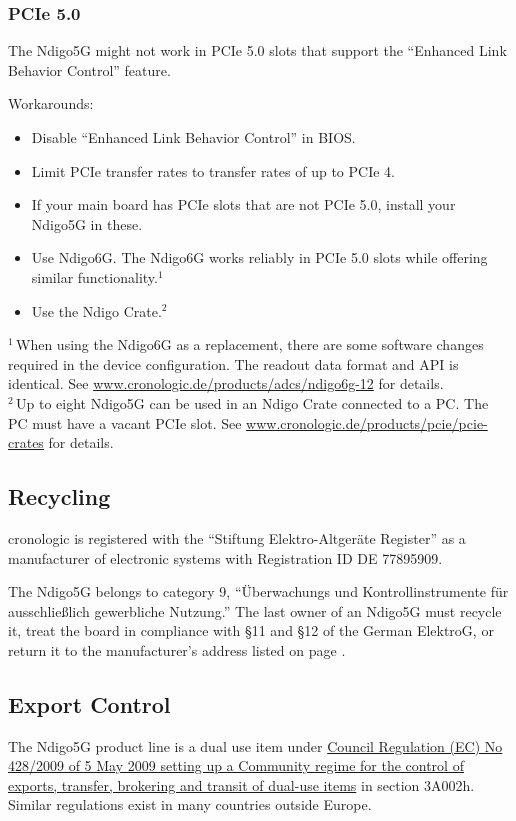 \subsubsection{PCIe 5.0}
The Ndigo5G might not work in PCIe 5.0 slots that support the ``Enhanced Link Behavior Control'' feature.\par
Workarounds:
\begin{itemize}
    \item Disable ``Enhanced Link Behavior Control'' in BIOS.
    \item Limit PCIe transfer rates to transfer rates of up to PCIe 4.
    \item If your main board has PCIe slots that are not PCIe 5.0, install your Ndigo5G in these.
    \item Use Ndigo6G. The Ndigo6G works reliably in PCIe 5.0 slots while offering similar functionality.$^1$
    \item Use the Ndigo Crate.$^2$
\end{itemize}
{\small $^1$\,When using the Ndigo6G as a replacement, there are some software changes required in the device configuration. The readout data format and API is identical. See \href{https://www.cronologic.de/products/adcs/ndigo6g-12}{www.cronologic.de/products/adcs/ndigo6g-12} for details.}\\
{\small $^2$\,Up to eight Ndigo5G can be used in an Ndigo Crate connected to a PC. The PC must have a vacant PCIe slot. See \href{https://www.cronologic.de/products/pcie/pcie-crates}{www.cronologic.de/products/pcie/pcie-crates} for details.}


\subsection{Recycling}

    cronologic is registered with the ``Stiftung Elektro-Altgeräte Register'' as a manufacturer of electronic systems with Registration ID DE 77895909.\par

    The Ndigo5G belongs to category 9, ``Überwachungs und Kontrollinstrumente f\"u{}r aus\-schlie\ss lich gewerbliche Nutzung.'' The last owner of an Ndigo5G must recycle it, treat the board in compliance with \S{}11 and \S{}12 of the German ElektroG, or return it to the manufacturer's address listed on page \pageref{cp:manu}.

\subsection{Export Control}
The Ndigo5G product line is a dual use item under \href{https://eur-lex.europa.eu/eli/reg/2009/428/oj}{Council Regulation (EC) No 428/2009 of 5 May 2009 setting up a Community regime for the control of exports, transfer, brokering and transit of dual-use items} in section 3A002h. Similar regulations exist in many countries outside Europe.

